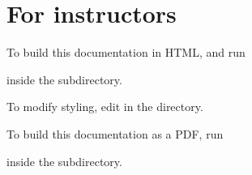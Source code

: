 \documentclass[letterpaper,10pt,english,openany,oneside]{sphinxmanual}
\begin{document}
\chapter{For instructors}
\label{\detokenize{index:for-instructors}}
To build this documentation in HTML,  and run

\begin{sphinxVerbatim}[commandchars=\\\{\}]
 
\end{sphinxVerbatim}

inside the  subdirectory.

To modify styling, edit  in the  directory.

To build this documentation as a PDF, run

\begin{sphinxVerbatim}[commandchars=\\\{\}]
 
\end{sphinxVerbatim}

inside the  subdirectory.



\renewcommand{\indexname}{Index}
\printindex
\end{document}
